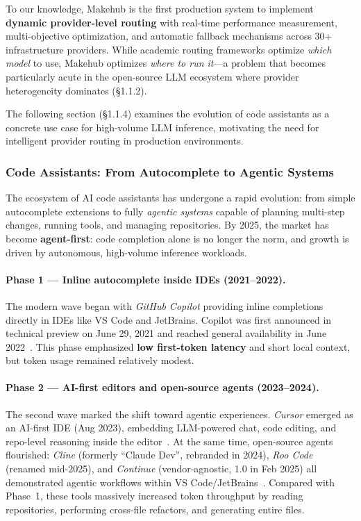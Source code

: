 \documentclass[english]{article}
\begin{document}
To our knowledge, Makehub is the first production system to implement \textbf{dynamic provider-level routing} with real-time performance measurement, multi-objective optimization, and automatic fallback mechanisms across 30+ infrastructure providers. While academic routing frameworks optimize \emph{which model} to use, Makehub optimizes \emph{where to run it}—a problem that becomes particularly acute in the open-source LLM ecosystem where provider heterogeneity dominates (§1.1.2).

The following section (§1.1.4) examines the evolution of code assistants as a concrete use case for high-volume LLM inference, motivating the need for intelligent provider routing in production environments.





\subsubsection{Code Assistants: From Autocomplete to Agentic Systems}

The ecosystem of AI code assistants has undergone a rapid evolution: from simple autocomplete extensions to fully \emph{agentic systems} capable of planning multi-step changes, running tools, and managing repositories. By 2025, the market has become \textbf{agent-first}: code completion alone is no longer the norm, and growth is driven by autonomous, high-volume inference workloads.

\paragraph{Phase 1 — Inline autocomplete inside IDEs (2021–2022).}
The modern wave began with \textit{GitHub Copilot} providing inline completions directly in IDEs like VS Code and JetBrains. 
Copilot was first announced in technical preview on June 29, 2021 and reached general availability in June 2022~\cite{github_copilot_preview,github_copilot_ga}.
This phase emphasized \textbf{low first-token latency} and short local context, but token usage remained relatively modest.

\paragraph{Phase 2 — AI-first editors and open-source agents (2023–2024).}
The second wave marked the shift toward agentic experiences. 
\textit{Cursor} emerged as an AI-first IDE (Aug 2023), embedding LLM-powered chat, code editing, and repo-level reasoning inside the editor~\cite{cursor2023,cursor_latentspace2023}.
At the same time, open-source agents flourished: \textit{Cline} (formerly ``Claude Dev'', rebranded in 2024), \textit{Roo Code} (renamed mid-2025), and \textit{Continue} (vendor-agnostic, 1.0 in Feb 2025) all demonstrated agentic workflows within VS Code/JetBrains~\cite{cline2024,roocode2025,continue2025}.
Compared with Phase~1, these tools massively increased token throughput by reading repositories, performing cross-file refactors, and generating entire files.
\end{document}
